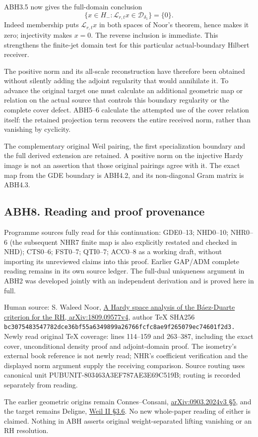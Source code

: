 ABH3.5 now gives the full-domain conclusion \[
\boxed{\{x\in H_-:\mathcal L_{r,t}x\in\mathcal D_{\delta_1}\}=\{0\}.}
\tag{ABH7.1}
\] Indeed membership puts \(\mathcal L_{r,t}x\) in both spaces of Noor's
theorem, hence makes it zero; injectivity makes \(x=0\). The reverse
inclusion is immediate. This strengthens the finite-jet domain test for
this particular actual-boundary Hilbert receiver.

The positive norm and its all-scale reconstruction have therefore been
obtained without silently adding the adjoint regularity that would
annihilate it. To advance the original target one must calculate an
additional geometric map or relation on the actual source that controls
this boundary regularity or the complete cover defect. ABH5--6 calculate
the attempted use of the cover relation itself: the retained projection
term recovers the entire received norm, rather than vanishing by
cyclicity.

The complementary original Weil pairing, the first specialization
boundary and the full derived extension are retained. A positive norm on
the injective Hardy image is not an assertion that those original
pairings agree with it. The exact map from the GDE boundary is ABH4.2,
and its non-diagonal Gram matrix is ABH4.3.

\subsection{ABH8. Reading and proof
provenance}\label{abh8.-reading-and-proof-provenance}

Programme sources fully read for this continuation: GDE0--13; NHD0--10;
NHR0--6 (the subsequent NHR7 finite map is also explicitly restated and
checked in NHD); CTS0--6; FST0--7; QTI0--7; ACC0--8 as a working draft,
without importing its unreviewed claims into this proof. Earlier GAP/ADM
complete reading remains in its own source ledger. The full-dual
uniqueness argument in ABH2 was developed jointly with an independent
derivation and is proved here in full.

Human source: S. Waleed Noor,
\href{https://arxiv.org/abs/1809.09577v4}{A Hardy space analysis of the
Báez-Duarte criterion for the RH, arXiv:1809.09577v4}, author TeX SHA256
\nolinkurl{bc3075483547782dce36bf55a6349899a26766fcfc8ae9f265079ec74601f2d3.}
Newly read original TeX coverage: lines 114--159 and 263--387, including
the exact cover, unconditional density proof and adjoint-domain proof.
The isometry's external book reference is not newly read; NHR's
coefficient verification and the displayed norm argument supply the
receiving comparison. Source routing uses canonical unit
PUBUNIT-803463A3EF787AE3E69C519B; routing is recorded separately from
reading.

The earlier geometric origins remain Connes--Consani,
\href{https://arxiv.org/abs/0903.2024v3}{arXiv:0903.2024v3 §5}, and the
target remains Deligne,
\href{https://numdam.org/item/PMIHES_1980__52__137_0/}{Weil II §3.6}. No
new whole-paper reading of either is claimed. Nothing in ABH asserts
original weight-separated lifting vanishing or an RH resolution.

